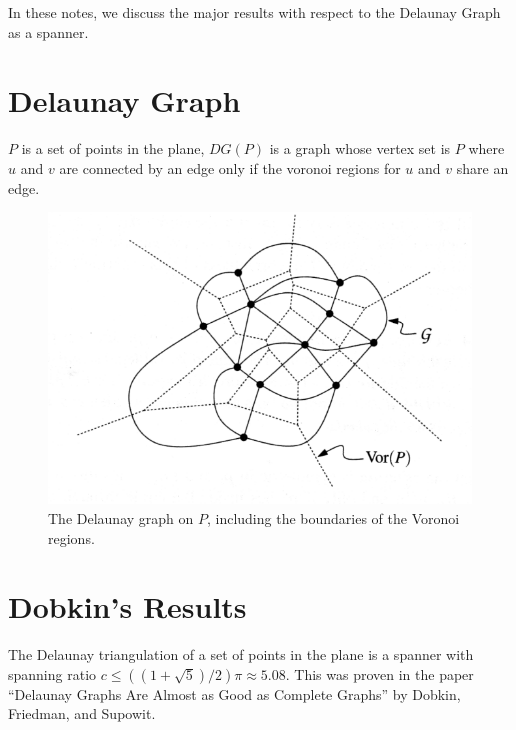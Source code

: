 \documentclass{tufte-handout}
\title{\DocTitle}
\author{\DocAuthor}
\begin{document}
\maketitle
\vspace{1cm}

In these notes, we discuss the major results with respect to the
Delaunay Graph as a spanner.

\part{Delaunay Graph}

$P$ is a set of points in the plane, $DG(P)$ is a graph whose vertex
set is $P$ where $u$ and $v$ are connected by an edge only if the
voronoi regions for $u$ and $v$ share an edge.

\begin{figure}
  \includegraphics[scale=1.6]{figures/delaunay_graph.png}
  \caption{The Delaunay graph on $P$, including the boundaries of the
    Voronoi regions.}
\end{figure}

\newpage

\part{Dobkin's Results}

The Delaunay triangulation of a set of points in the plane is a
spanner with spanning ratio $c \le ((1 + \sqrt{5})/2)\pi \approx
5.08$.  This was proven in the paper ``Delaunay Graphs Are Almost as
Good as Complete Graphs'' by Dobkin, Friedman, and Supowit.  
\cite{Dobkin:1987} \cite{Dobkin:1990}
\end{document}
